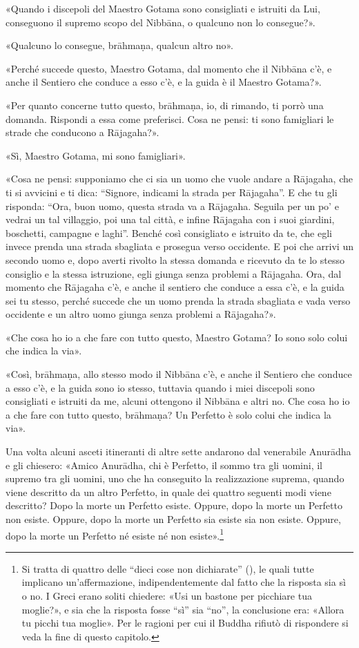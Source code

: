 
«Quando i discepoli del Maestro Gotama sono consigliati e istruiti da Lui,
conseguono il supremo scopo del Nibbāna, o qualcuno non lo consegue?».

«Qualcuno lo consegue, brāhmaṇa, qualcun altro no».

«Perché succede questo, Maestro Gotama, dal momento che il Nibbāna c’è, e anche
il Sentiero che conduce a esso c’è, e la guida è il Maestro Gotama?».

«Per quanto concerne tutto questo, brāhmaṇa, io, di rimando, ti porrò una
domanda. Rispondi a essa come preferisci. Cosa ne pensi: ti sono famigliari le
strade che conducono a Rājagaha?».

«Sì, Maestro Gotama, mi sono famigliari».

«Cosa ne pensi: supponiamo che ci sia un uomo che vuole andare a Rājagaha, che
ti si avvicini e ti dica: “Signore, indicami la strada per Rājagaha”. E che tu
gli risponda: “Ora, buon uomo, questa strada va a Rājagaha. Seguila per un po’ e
vedrai un tal villaggio, poi una tal città, e infine Rājagaha con i suoi
giardini, boschetti, campagne e laghi”. Benché così consigliato e istruito da
te, che egli invece prenda una strada sbagliata e prosegua verso occidente. E
poi che arrivi un secondo uomo e, dopo averti rivolto la stessa domanda e
ricevuto da te lo stesso consiglio e la stessa istruzione, egli giunga senza
problemi a Rājagaha. Ora, dal momento che Rājagaha c’è, e anche il sentiero che
conduce a essa c’è, e la guida sei tu stesso, perché succede che un uomo prenda
la strada sbagliata e vada verso occidente e un altro uomo giunga senza problemi
a Rājagaha?».

«Che cosa ho io a che fare con tutto questo, Maestro Gotama? Io sono solo colui
che indica la via».

«Così, brāhmaṇa, allo stesso modo il Nibbāna c’è, e anche il Sentiero che
conduce a esso c’è, e la guida sono io stesso, tuttavia quando i miei discepoli
sono consigliati e istruiti da me, alcuni ottengono il Nibbāna e altri no. Che
cosa ho io a che fare con tutto questo, brāhmaṇa? Un Perfetto è solo colui che
indica la via».


Una volta alcuni asceti itineranti di altre sette andarono dal venerabile
Anurādha e gli chiesero: «Amico Anurādha, chi è Perfetto, il sommo tra gli
uomini, il supremo tra gli uomini, uno che ha conseguito la realizzazione
suprema, quando viene descritto da un altro Perfetto, in quale dei quattro
seguenti modi viene descritto? Dopo la morte un Perfetto esiste. Oppure, dopo la
morte un Perfetto non esiste. Oppure, dopo la morte un Perfetto sia esiste sia
non esiste. Oppure, dopo la morte un Perfetto né esiste né non
esiste».\footnote{Si tratta di quattro delle “dieci cose non dichiarate”
  (\hyperlink{cap-12-La-Dottrina#pag230}{}), le quali tutte implicano
  un’affermazione, indipendentemente dal fatto che la risposta sia sì o no. I
  Greci erano soliti chiedere: «Usi un bastone per picchiare tua moglie?», e sia
  che la risposta fosse “sì” sia “no”, la conclusione era: «Allora tu picchi tua
  moglie». Per le ragioni per cui il Buddha rifiutò di rispondere si veda la
  fine di questo capitolo.}


